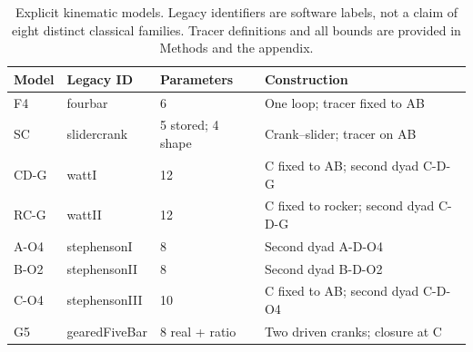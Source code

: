 \begin{table}[H]
\caption{Explicit kinematic models. Legacy identifiers are software labels, not a claim of eight distinct classical families. Tracer definitions and all bounds are provided in Methods and the appendix.}
\label{tab:v2_models}
\centering
\small
\begin{tabular}{@{}lllp{5.1cm}@{}}
\toprule
Model & Legacy ID & Parameters & Construction \\
\midrule
F4 & fourbar & 6 & One loop; tracer fixed to AB \\
SC & slidercrank & 5 stored; 4 shape & Crank--slider; tracer on AB \\
CD-G & wattI & 12 & C fixed to AB; second dyad C-D-G \\
RC-G & wattII & 12 & C fixed to rocker; second dyad C-D-G \\
A-O4 & stephensonI & 8 & Second dyad A-D-O4 \\
B-O2 & stephensonII & 8 & Second dyad B-D-O2 \\
C-O4 & stephensonIII & 10 & C fixed to AB; second dyad C-D-O4 \\
G5 & gearedFiveBar & 8 real + ratio & Two driven cranks; closure at C \\
\bottomrule
\end{tabular}
\end{table}
